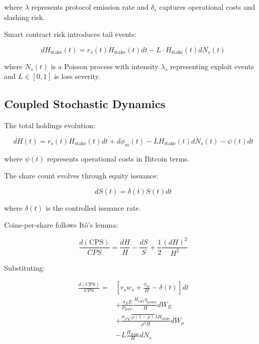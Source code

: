 \documentclass[
  journal=medium,
  manuscript=article-type,
  year=2025,
  volume=1,
]{cup-journal}
\theoremstyle{definition}
\begin{document}
where $\lambda$ represents protocol emission rate and $\delta_s$ captures operational costs and slashing risk.

Smart contract risk introduces tail events:

\begin{equation}
dH_{\text{stake}}(t) = r_s(t) H_{\text{stake}}(t) dt - L \cdot H_{\text{stake}}(t) dN_s(t)
\end{equation}

where $N_s(t)$ is a Poisson process with intensity $\lambda_s$ representing exploit events and $L \in [0, 1]$ is loss severity.

\subsection{Coupled Stochastic Dynamics}

The total holdings evolution:

\begin{equation}
dH(t) = r_s(t) H_{\text{stake}}(t) dt + d\phi_m(t) - L H_{\text{stake}}(t) dN_s(t) - \psi(t) dt
\end{equation}

where $\psi(t)$ represents operational costs in Bitcoin terms.

The share count evolves through equity issuance:

\begin{equation}
dS(t) = \delta(t) S(t) dt
\end{equation}

where $\delta(t)$ is the controlled issuance rate.

Coins-per-share follows Itô's lemma:

\begin{equation}
\frac{d(\text{CPS})}{CPS} = \frac{dH}{H} - \frac{dS}{S} + \frac{1}{2}\frac{(dH)^2}{H^2}
\end{equation}

Substituting:

\begin{align}
\frac{d(\text{CPS})}{\text{CPS}} = &\left[ r_s w_s + \frac{\phi_m}{H} - \delta(t) \right] dt \\
&+ \frac{\sigma_E E}{P_{\text{BTC}}} \frac{H_{\text{rate}} \eta_{\text{power}}}{H} dW_E \\
&+ \frac{\sigma_\rho \sqrt{\rho(1-\rho)} \lambda H_{\text{stake}}}{\rho^2 H} dW_\rho \\
&- L \frac{H_{\text{stake}}}{H} dN_s
\end{align}
\end{document}
